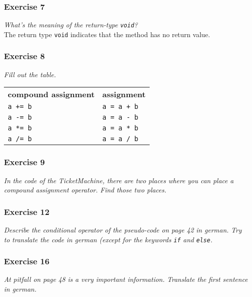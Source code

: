 \subsubsection*{Exercise 7}
\textit{What's the meaning of the return-type \lstinline{void}?}\\

The return type \lstinline{void} indicates that the method has no
return value.

\subsubsection*{Exercise 8}
\textit{Fill out the table.}\\

\begin{table}[h!]
\centering
\begin{tabular}{ll}
\textbf{compound assignment} & \textbf{assignment} \\
\lstinline!a += b! & \lstinline!a = a + b! \\
\lstinline!a -= b! & \lstinline!a = a - b! \\
\lstinline!a *= b! & \lstinline!a = a * b! \\
\lstinline!a /= b! & \lstinline!a = a / b!\\
\end{tabular}
\end{table}

\subsubsection*{Exercise 9}
\textit{In the code of the TicketMachine, there are two places where you
can place a compound assignment operator. Find those two
places.}\\



\subsubsection*{Exercise 12}
\textit{Describe the conditional operator of the pseudo-code on page 42
in german. Try to translate the code in german (except for the keywords
\lstinline{if} and \lstinline{else}.}\\



\subsubsection*{Exercise 16}
\textit{At pitfall on page 48 is a very important information.
Translate the first sentence in german.}\\



